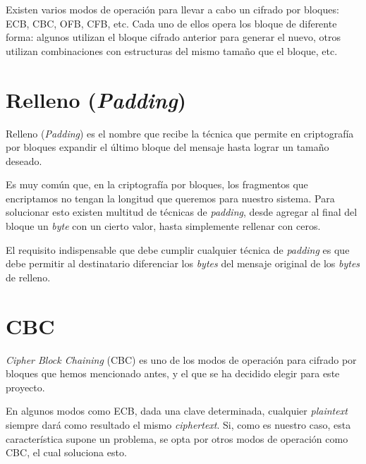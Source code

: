 Existen varios modos de operación para llevar a cabo un cifrado por bloques: ECB, CBC, OFB, CFB, etc. Cada uno de ellos opera los bloque de diferente forma: algunos utilizan el bloque cifrado anterior para generar el nuevo, otros utilizan combinaciones con estructuras del mismo tamaño que el bloque, etc. \emph{\parencite{Reference21}}


\section{Relleno (\emph{Padding})}

Relleno (\emph{Padding}) es el nombre que recibe la técnica que permite en criptografía por bloques expandir el último bloque del mensaje hasta lograr un tamaño deseado.

Es muy común que, en la criptografía por bloques, los fragmentos que encriptamos no tengan la longitud que queremos para nuestro sistema. Para solucionar esto existen multitud de técnicas de \emph{padding}, desde agregar al final del bloque un \emph{byte} con un cierto valor, hasta simplemente rellenar con ceros.

El requisito indispensable que debe cumplir cualquier técnica de \emph{padding} es que debe permitir al destinatario diferenciar los \emph{bytes} del mensaje original de los \emph{bytes} de relleno. \emph{\parencite{Reference8}}


\section{CBC}

\emph{Cipher Block Chaining} (CBC) es uno de los modos de operación para cifrado por bloques que hemos mencionado antes, y el que se ha decidido elegir para este proyecto.

En algunos modos como ECB, dada una clave determinada, cualquier \emph{plaintext} siempre dará como resultado el mismo \emph{ciphertext}. Si, como es nuestro caso, esta característica supone un problema, se opta por otros modos de operación como CBC, el cual soluciona esto. \emph{\parencite{Reference23}}

